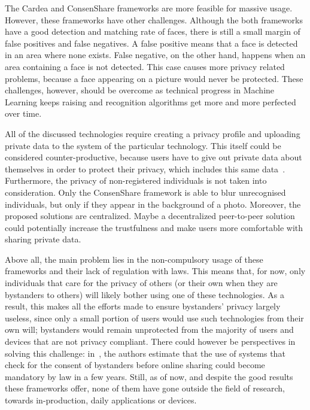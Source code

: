 \documentclass[conference, 11pt]{IEEEtran}
\begin{document}
The Cardea and ConsenShare frameworks are more feasible for massive usage. However, these frameworks have other challenges. Although the both frameworks have a good detection and matching rate of faces, there is still a small margin of false positives and false negatives. A false positive means that a face is detected in an area where none exists. False negative, on the other hand, happens when an area containing a face is not detected. This case causes more privacy related problems, because a face appearing on a picture would never be protected. These challenges, however, should be overcome as technical progress in Machine Learning keeps raising and recognition algorithms get more and more perfected over time. 

All of the discussed technologies require creating a privacy profile and uploading private data to the system of the particular technology. This itself could be considered counter-productive, because users have to give out private data about themselves in order to protect their privacy, which includes this same data~\cite{denning2014situ}. Furthermore, the privacy of non-registered individuals is not taken into consideration. Only the ConsenShare framework is able to blur unrecognised individuals, but only if they appear in the background of a photo. Moreover, the proposed solutions are centralized. Maybe a decentralized peer-to-peer solution could potentially increase the trustfulness and make users more comfortable with sharing private data.

Above all, the main problem lies in the non-compulsory usage of these frameworks and their lack of regulation with laws. This means that, for now, only individuals that care for the privacy of others (or their own when they are bystanders to others) will likely bother using one of these technologies. As a result, this makes all the efforts made to ensure bystanders' privacy largely useless, since only a small portion of users would use such technologies from their own will; bystanders would remain unprotected from the majority of users and devices that are not privacy compliant. There could however be perspectives in solving this challenge: in~\cite{olteanu2018consensual}, the authors estimate that the use of systems that check for the consent of bystanders before online sharing could become mandatory by law in a few years. Still, as of now, and despite the good results these frameworks offer, none of them have gone outside the field of research, towards in-production, daily applications or devices.
\end{document}
